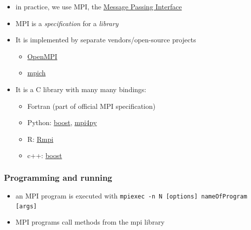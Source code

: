 \begin{itemize}
\itemsep1pt\parskip0pt
\item
  in practice, we use MPI, the
  \href{http://en.wikipedia.org/wiki/Message_Passing_Interface}{Message
  Passing Interface}
\item
  MPI is a \emph{specification} for a \emph{library}
\item
  It is implemented by separate vendors/open-source projects

  \begin{itemize}
  \itemsep1pt\parskip0pt
  \item
    \href{http://www.open-mpi.org/}{OpenMPI}
  \item
    \href{http://www.mpich.org/}{mpich}
  \end{itemize}
\item
  It is a C library with many many bindings:

  \begin{itemize}
  \itemsep1pt\parskip0pt
  \item
    Fortran (part of official MPI specification)
  \item
    Python:
    \href{http://www.boost.org/doc/libs/1_55_0/doc/html/mpi/python.html}{boost},
    \href{http://mpi4py.scipy.org/}{mpi4py}
  \item
    R:
    \href{http://cran.r-project.org/web/packages/Rmpi/index.html}{Rmpi}
  \item
    c++:
    \href{http://www.boost.org/doc/libs/1_57_0/doc/html/mpi.html}{boost}
  \end{itemize}
\end{itemize}

\subsubsection{Programming and running}\label{programming-and-running}

\begin{itemize}
\item
  an MPI program is executed with
  \texttt{mpiexec -n N {[}options{]} nameOfProgram {[}args{]}}
\item
  MPI programs call methods from the mpi library
\end{itemize}

\begin{Shaded}
\begin{Highlighting}[]
    
\end{Highlighting}
\end{Shaded}

